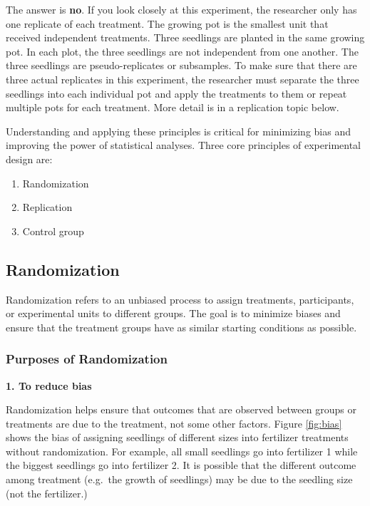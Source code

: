 \documentclass[
]{book}
\providecommand{\tightlist}{%
  \setlength{\itemsep}{0pt}\setlength{\parskip}{0pt}}
\begin{document}
The answer is \textbf{no}. If you look closely at this experiment, the researcher only has one replicate of each treatment. The growing pot is the smallest unit that received independent treatments. Three seedlings are planted in the same growing pot. In each plot, the three seedlings are not independent from one another. The three seedlings are pseudo-replicates or subsamples. To make sure that there are three actual replicates in this experiment, the researcher must separate the three seedlings into each individual pot and apply the treatments to them or repeat multiple pots for each treatment. More detail is in a replication topic below.

Understanding and applying these principles is critical for minimizing bias and improving the power of statistical analyses. Three core principles of experimental design \citep{gotelli2013} are:

\begin{enumerate}
\def\labelenumi{\arabic{enumi}.}
\tightlist
\item
  Randomization
\item
  Replication
\item
  Control group
\end{enumerate}

\subsection{Randomization}\label{randomization}

Randomization refers to an unbiased process to assign treatments, participants, or experimental units to different groups. The goal is to minimize biases and ensure that the treatment groups have as similar starting conditions as possible.

\subsubsection{Purposes of Randomization}\label{purposes-of-randomization}

\textbf{1. To reduce bias}

Randomization helps ensure that outcomes that are observed between groups or treatments are due to the treatment, not some other factors. Figure \ref{fig:bias} shows the bias of assigning seedlings of different sizes into fertilizer treatments without randomization. For example, all small seedlings go into fertilizer 1 while the biggest seedlings go into fertilizer 2. It is possible that the different outcome among treatment (e.g.~the growth of seedlings) may be due to the seedling size (not the fertilizer.)
\end{document}
